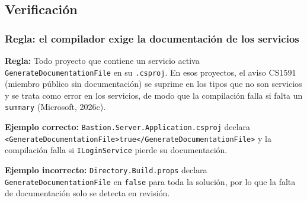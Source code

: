 \subsection{Verificación}

\subsubsection{Regla: el compilador exige la documentación de los servicios}

\textbf{Regla:} Todo proyecto que contiene un servicio activa \texttt{GenerateDocumentationFile} en su \texttt{.csproj}. En esos proyectos, el aviso CS1591 (miembro público sin documentación) se suprime en los tipos que no son servicios y se trata como error en los servicios, de modo que la compilación falla si falta un \texttt{summary} (Microsoft, 2026c).

\textbf{Ejemplo correcto:} \texttt{Bastion.Server.Application.csproj} declara \texttt{<GenerateDocumentationFile>true</GenerateDocumentationFile>} y la compilación falla si \texttt{ILoginService} pierde su documentación.

\textbf{Ejemplo incorrecto:} \texttt{Directory.Build.props} declara \texttt{GenerateDocumentationFile} en \texttt{false} para toda la solución, por lo que la falta de documentación solo se detecta en revisión.
